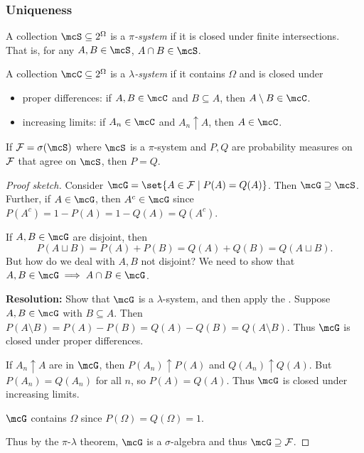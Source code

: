 \subsubsection{Uniqueness}
\begin{definition*}[$\pi$-system] \label{def:pi}
    A collection $\mcS \subseteq 2^\Omega$ is a \emph{$\pi$-system}
    if it is closed under finite intersections.
    That is, for any $A, B \in \mcS$, $A \cap B \in \mcS$.
\end{definition*}
\begin{definition*} \label{def:lambda}
    A collection $\mcC \subseteq 2^\Omega$ is a \emph{$\lambda$-system}
    if it contains $\Omega$ and is closed under
    \begin{itemize}
        \item proper differences: if $A, B \in \mcC$ and $B \subseteq A$,
            then $A \setminus B \in \mcC$.
        \item increasing limits: if $A_n \in \mcC$ and $A_n \uparrow A$,
            then $A \in \mcC$.
    \end{itemize}
\end{definition*}

\begin{theorem} \label{thm:unique}
    If $\F = \sigma(\mcS)$ where $\mcS$ is a $\pi$-system and
    $P, Q$ are probability measures on $\mathcal F$ that agree on $\mcS$,
    then $P = Q$.
\end{theorem}
\begin{proof}[Proof sketch]
    Consider $\mcG = \set{A \in \F \mid P(A) = Q(A)}$.
    Then $\mcG \supseteq \mcS$.
    Further, if $A \in \mcG$, then $A^c \in \mcG$
    since $P(A^c) = 1 - P(A) = 1 - Q(A) = Q(A^c)$.

    If $A, B \in \mcG$ are disjoint, then \[
        P(A \sqcup B) = P(A) + P(B) = Q(A) + Q(B) = Q(A \sqcup B).
    \] But how do we deal with $A, B$ not disjoint?
    We need to show that $A, B \in \mcG \implies A \cap B \in \mcG$.

    \textbf{Resolution:} Show that $\mcG$ is a $\lambda$-system,
    and then apply the .
    Suppose $A, B \in \mcG$ with $B \subseteq A$.
    Then $P(A \setminus B) = P(A) - P(B) = Q(A) - Q(B) = Q(A \setminus B)$.
    Thus $\mcG$ is closed under proper differences.

    If $A_n \uparrow A$ are in $\mcG$, then $P(A_n) \uparrow P(A)$ and
    $Q(A_n) \uparrow Q(A)$.
    But $P(A_n) = Q(A_n)$ for all $n$, so $P(A) = Q(A)$.
    Thus $\mcG$ is closed under increasing limits.

    $\mcG$ contains $\Omega$ since $P(\Omega) = Q(\Omega) = 1$.

    Thus by the $\pi$-$\lambda$ theorem, $\mcG$ is a $\sigma$-algebra
    and thus $\mcG \supseteq \F$.
\end{proof}

